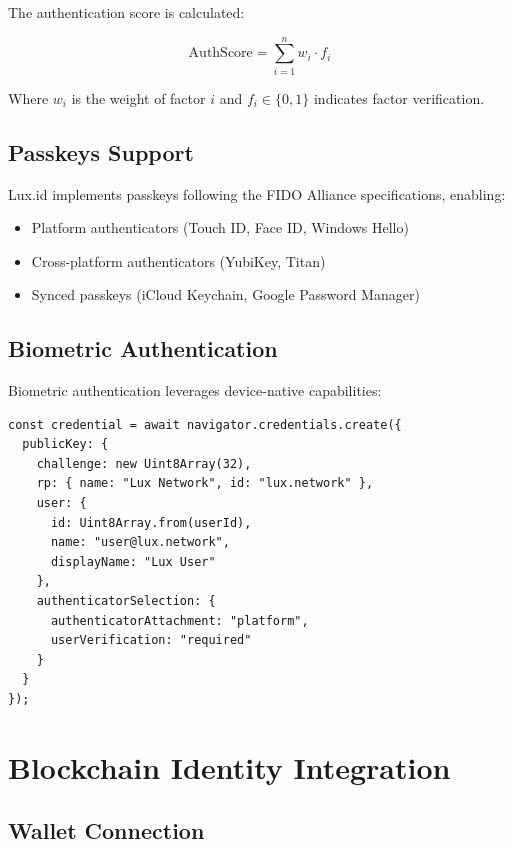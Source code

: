 \documentclass[11pt,a4paper]{article}
\begin{document}
The authentication score is calculated:

\begin{equation}
    \text{AuthScore} = \sum_{i=1}^{n} w_i \cdot f_i
\end{equation}

Where $w_i$ is the weight of factor $i$ and $f_i \in \{0,1\}$ indicates factor verification.

\subsection{Passkeys Support}

Lux.id implements passkeys following the FIDO Alliance specifications, enabling:

\begin{itemize}
    \item Platform authenticators (Touch ID, Face ID, Windows Hello)
    \item Cross-platform authenticators (YubiKey, Titan)
    \item Synced passkeys (iCloud Keychain, Google Password Manager)
\end{itemize}

\subsection{Biometric Authentication}

Biometric authentication leverages device-native capabilities:

\begin{lstlisting}[language=Solidity]
const credential = await navigator.credentials.create({
  publicKey: {
    challenge: new Uint8Array(32),
    rp: { name: "Lux Network", id: "lux.network" },
    user: {
      id: Uint8Array.from(userId),
      name: "user@lux.network",
      displayName: "Lux User"
    },
    authenticatorSelection: {
      authenticatorAttachment: "platform",
      userVerification: "required"
    }
  }
});
\end{lstlisting}

\section{Blockchain Identity Integration}

\subsection{Wallet Connection}
\end{document}
